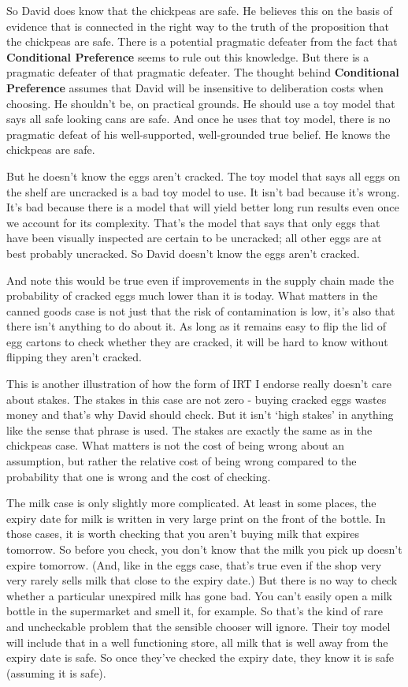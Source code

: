 \documentclass[11pt,]{book}
\begin{document}
So David does know that the chickpeas are safe. He believes this on the basis of evidence that is connected in the right way to the truth of the proposition that the chickpeas are safe. There is a potential pragmatic defeater from the fact that \textbf{Conditional Preference} seems to rule out this knowledge. But there is a pragmatic defeater of that pragmatic defeater. The thought behind \textbf{Conditional Preference} assumes that David will be insensitive to deliberation costs when choosing. He shouldn't be, on practical grounds. He should use a toy model that says all safe looking cans are safe. And once he uses that toy model, there is no pragmatic defeat of his well-supported, well-grounded true belief. He knows the chickpeas are safe.

But he doesn't know the eggs aren't cracked. The toy model that says all eggs on the shelf are uncracked is a bad toy model to use. It isn't bad because it's wrong. It's bad because there is a model that will yield better long run results even once we account for its complexity. That's the model that says that only eggs that have been visually inspected are certain to be uncracked; all other eggs are at best probably uncracked. So David doesn't know the eggs aren't cracked.

And note this would be true even if improvements in the supply chain made the probability of cracked eggs much lower than it is today. What matters in the canned goods case is not just that the risk of contamination is low, it's also that there isn't anything to do about it. As long as it remains easy to flip the lid of egg cartons to check whether they are cracked, it will be hard to know without flipping they aren't cracked.

This is another illustration of how the form of IRT I endorse really doesn't care about stakes. The stakes in this case are not zero - buying cracked eggs wastes money and that's why David should check. But it isn't `high stakes' in anything like the sense that phrase is used. The stakes are exactly the same as in the chickpeas case. What matters is not the cost of being wrong about an assumption, but rather the relative cost of being wrong compared to the probability that one is wrong and the cost of checking.

The milk case is only slightly more complicated. At least in some places, the expiry date for milk is written in very large print on the front of the bottle. In those cases, it is worth checking that you aren't buying milk that expires tomorrow. So before you check, you don't know that the milk you pick up doesn't expire tomorrow. (And, like in the eggs case, that's true even if the shop very very rarely sells milk that close to the expiry date.) But there is no way to check whether a particular unexpired milk has gone bad. You can't easily open a milk bottle in the supermarket and smell it, for example. So that's the kind of rare and uncheckable problem that the sensible chooser will ignore. Their toy model will include that in a well functioning store, all milk that is well away from the expiry date is safe. So once they've checked the expiry date, they know it is safe (assuming it is safe).
\end{document}
